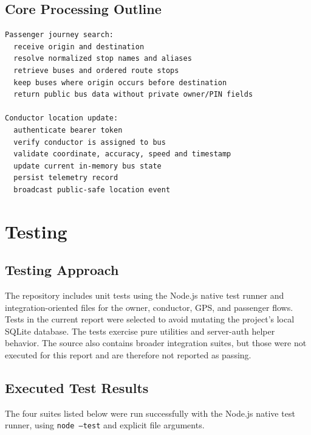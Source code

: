 \documentclass[12pt,a4paper]{report}
\begin{document}
\section{Core Processing Outline}
\begin{verbatim}
Passenger journey search:
  receive origin and destination
  resolve normalized stop names and aliases
  retrieve buses and ordered route stops
  keep buses where origin occurs before destination
  return public bus data without private owner/PIN fields

Conductor location update:
  authenticate bearer token
  verify conductor is assigned to bus
  validate coordinate, accuracy, speed and timestamp
  update current in-memory bus state
  persist telemetry record
  broadcast public-safe location event
\end{verbatim}

\chapter{Testing}
\section{Testing Approach}
The repository includes unit tests using the Node.js native test runner and integration-oriented files for the owner, conductor, GPS, and passenger flows. Tests in the current report were selected to avoid mutating the project's local SQLite database. The tests exercise pure utilities and server-auth helper behavior. The source also contains broader integration suites, but those were not executed for this report and are therefore not reported as passing.

\section{Executed Test Results}
The four suites listed below were run successfully with the Node.js native test runner, using \texttt{node --test} and explicit file arguments.
\end{document}
